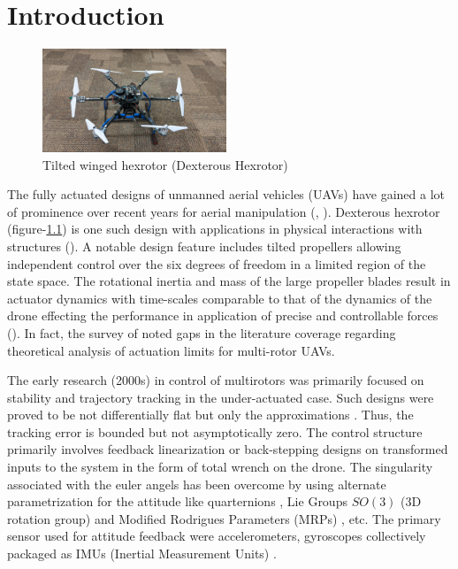 \chapter{Introduction}


\begin{figure}[H]
        \centering
        \includegraphics[width = 0.49\textwidth]{Part2/figs/1_figs/drone.jpg}
        \caption{Tilted winged hexrotor (Dexterous Hexrotor)}
        \label{fig::drone}
\end{figure}


\par The fully actuated designs of unmanned aerial vehicles (UAVs) have gained a lot of prominence over recent years for
aerial manipulation (\cite{ding2021design}, \cite{ryll20176d}). Dexterous hexrotor (figure-\ref{fig::drone}) is one such
design with applications in physical interactions with structures (\cite{jiang2017estimation}). A notable design feature
includes tilted propellers allowing independent control over the six degrees of freedom in a limited region of the state
space. The rotational inertia and mass of the large propeller blades result in actuator dynamics with time-scales
comparable to that of the dynamics of the drone effecting the performance in application of precise and controllable
forces (\cite{hamandi2021design}). In fact, the survey of \cite{hamandi2021design} noted gaps in the literature coverage
regarding theoretical analysis of actuation limits for multi-rotor UAVs.

\par The early research (2000s) in control of multirotors was primarily focused on stability and trajectory tracking in the under-actuated case. Such designs were proved to be not differentially flat but only the approximations \cite{Koo1998}. Thus, the tracking error is bounded but not asymptotically zero. The control structure primarily involves feedback linearization \cite{Mokhtari2004} or back-stepping designs \cite{Mistier2001} on transformed inputs to the system in the form of total wrench on the drone. The singularity associated with the euler angels has been overcome by using alternate parametrization for the attitude like quarternions \cite{Tayebi2006}, Lie Groups $SO(3)$ (3D rotation group)\cite{canYang} and Modified Rodrigues Parameters (MRPs) \cite{crassidis1996attitude}, etc. The primary sensor used for attitude feedback were accelerometers, gyroscopes collectively packaged as IMUs (Inertial Measurement Units) \cite{Martin2010}.

